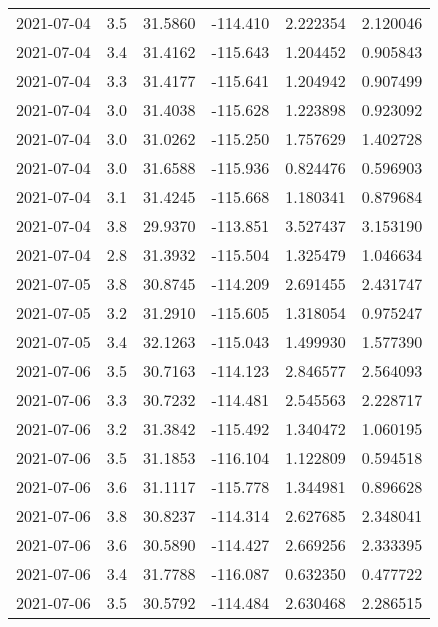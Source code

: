 \begin{tabular}{lrrrrr}
2021-07-04 &       3.5 &  31.5860 &  -114.410 &         2.222354 &         2.120046 \\
2021-07-04 &       3.4 &  31.4162 &  -115.643 &         1.204452 &         0.905843 \\
2021-07-04 &       3.3 &  31.4177 &  -115.641 &         1.204942 &         0.907499 \\
2021-07-04 &       3.0 &  31.4038 &  -115.628 &         1.223898 &         0.923092 \\
2021-07-04 &       3.0 &  31.0262 &  -115.250 &         1.757629 &         1.402728 \\
2021-07-04 &       3.0 &  31.6588 &  -115.936 &         0.824476 &         0.596903 \\
2021-07-04 &       3.1 &  31.4245 &  -115.668 &         1.180341 &         0.879684 \\
2021-07-04 &       3.8 &  29.9370 &  -113.851 &         3.527437 &         3.153190 \\
2021-07-04 &       2.8 &  31.3932 &  -115.504 &         1.325479 &         1.046634 \\
2021-07-05 &       3.8 &  30.8745 &  -114.209 &         2.691455 &         2.431747 \\
2021-07-05 &       3.2 &  31.2910 &  -115.605 &         1.318054 &         0.975247 \\
2021-07-05 &       3.4 &  32.1263 &  -115.043 &         1.499930 &         1.577390 \\
2021-07-06 &       3.5 &  30.7163 &  -114.123 &         2.846577 &         2.564093 \\
2021-07-06 &       3.3 &  30.7232 &  -114.481 &         2.545563 &         2.228717 \\
2021-07-06 &       3.2 &  31.3842 &  -115.492 &         1.340472 &         1.060195 \\
2021-07-06 &       3.5 &  31.1853 &  -116.104 &         1.122809 &         0.594518 \\
2021-07-06 &       3.6 &  31.1117 &  -115.778 &         1.344981 &         0.896628 \\
2021-07-06 &       3.8 &  30.8237 &  -114.314 &         2.627685 &         2.348041 \\
2021-07-06 &       3.6 &  30.5890 &  -114.427 &         2.669256 &         2.333395 \\
2021-07-06 &       3.4 &  31.7788 &  -116.087 &         0.632350 &         0.477722 \\
2021-07-06 &       3.5 &  30.5792 &  -114.484 &         2.630468 &         2.286515 \\

\end{tabular}
